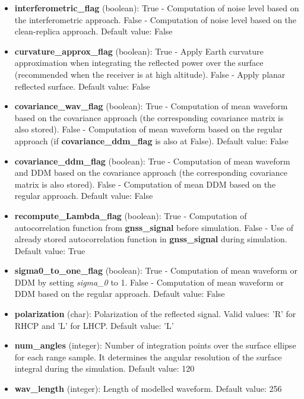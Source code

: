 \begin{itemize}
\item {\bf interferometric\_flag} (boolean): True - Computation of noise level based on the interferometric approach. False - Computation of noise level based on the clean-replica approach. Default value: False

\item {\bf curvature\_approx\_flag} (boolean): True - Apply Earth curvature approximation when integrating the reflected power over the surface (recommended when the receiver is at high altitude). False - Apply planar reflected surface. Default value: False

\item {\bf covariance\_wav\_flag} (boolean): True - Computation of mean waveform based on the covariance approach (the corresponding covariance matrix is also stored). False - Computation of mean waveform based on the regular approach (if {\bf covariance\_ddm\_flag} is also at False). Default value: False

\item {\bf covariance\_ddm\_flag} (boolean): True - Computation of mean waveform and DDM based on the covariance approach (the corresponding covariance matrix is also stored). False - Computation of mean DDM based on the regular approach. Default value: False

\item {\bf recompute\_Lambda\_flag} (boolean): True - Computation of autocorrelation function from {\bf gnss\_signal} before simulation. False - Use of already stored autocorrelation function in {\bf gnss\_signal} during simulation. Default value: True

\item {\bf sigma0\_to\_one\_flag} (boolean): True - Computation of mean waveform or DDM by setting {\it sigma\_0} to 1. False - Computation of mean waveform or DDM based on the regular approach. Default value: False

\item {\bf polarization} (char): Polarization of the reflected signal. Valid values: 'R' for RHCP and 'L' for LHCP. Default value: 'L'

\item {\bf num\_angles} (integer): Number of integration points over the surface ellipse for each range sample. It determines the angular resolution of the surface integral during the simulation. Default value: 120

\item {\bf wav\_length} (integer): Length of modelled waveform. Default value: 256


\end{itemize}
